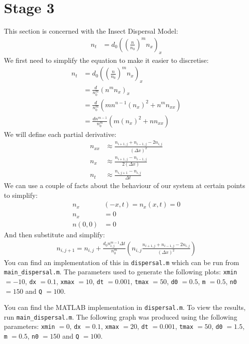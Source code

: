 \documentclass[]{article}
\def\incode#1{\texttt{#1}}
\begin{document}
	\section{Stage 3}
	This section is concerned with the Insect Dispersal Model:
	\begin{align}
		n_t &= d_0 \left( \left(\frac{n}{n_0}\right)^m n_x \right)_x 
	\end{align}
	We first need to simplify the equation to make it easier to discretise:
	\begin{align}
		n_t &= d_0 \left( \left(\frac{n}{n_0}\right)^m n_x \right)_x \\
		&= \frac{d}{n_{0}^m} \left( n^m n_x \right)_x \\
		&= \frac{d}{n_{0}^m} \left( mn^{n - 1} (n_x)^2 + n^m n_{xx} \right) \\
		&= \frac{dn^{m - 1}}{n_{0}^m} \left( m(n_x)^2 + nn_{xx} \right) 
	\end{align}
	We will define each partial derivative:
	\begin{align}
		n_{xx} &\approx \frac{n_{i + 1, j} + n_{i - 1, j} -2n_{i, j}}{(\Delta x)^2} \\
		n_x &\approx \frac{n_{i + 1, j} - n_{i - 1, j}}{2(\Delta x)} \\
		n_t &\approx \frac{n_{i, j + 1} - n_{i, j}}{\Delta t} 
	\end{align}
	We can use a couple of facts about the behaviour of our system at certain points to simplify:
	\begin{align}
		n_x&(-x, t) = n_x(x, t) = 0 \\ n_x &= 0 \\ n(0, 0) &= 0
	\end{align}
	And then substitute and simplify:
	\begin{align}
		n_{i, j + 1} = n_{i,j} + \frac{d_0 n_{i, j}^{m - 1} \Delta t}{n_0^m} \left( n_{i,j} \frac{n_{i + 1, j} + n_{i - 1, j} - 2n_{i, j}}{(\Delta x)^2} \right)
	\end{align}
	You can find an implementation of this in \incode{dispersal.m} which can be run from \incode{main\_dispersal.m}. The parameters used to generate the following plots: \incode{xmin} $= -10$, \incode{dx} $= 0.1$, \incode{xmax} $= 10$, \incode{dt} $= 0.001$, \incode{tmax} $= 50$, \incode{d0} $= 0.5$, \incode{m} $= 0.5$, \incode{n0} $= 150$ and \incode{Q} $= 100$. 
	
	You can find the MATLAB implementation in \incode{dispersal.m}. To view the results, run \incode{main\_dispersal.m}. The following graph was produced using the following parameters: \incode{xmin} $= 0$, \incode{dx} $= 0.1$, \incode{xmax} $= 20$, \incode{dt} $= 0.001$, \incode{tmax} $= 50$, \incode{d0} $= 1.5$, \incode{m} $= 0.5$, \incode{n0} $= 150$ and \incode{Q} $= 100$. 
	
\end{document}
